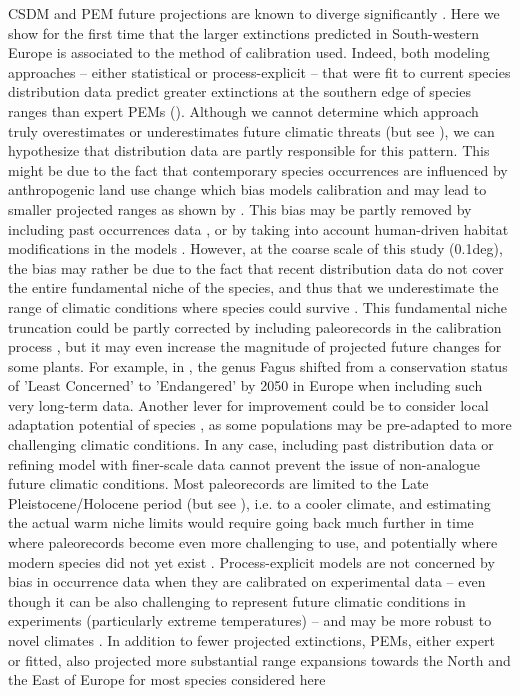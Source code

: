 \documentclass[letterpaper,8pt]{extarticle}  %
\begin{document}
\begin{doublespacing}
\begin{linenumbers}
CSDM and PEM future projections are known to diverge significantly \citep{Morin2009, Keenan2011, Cheaib2012, Takolander2019}.
Here we show for the first time that the larger extinctions predicted in South-western Europe is associated to the method of calibration used. Indeed, both modeling approaches -- either statistical or process-explicit -- that were fit to current species distribution data predict greater extinctions at the southern edge of species ranges than expert PEMs (). Although we cannot determine which approach truly overestimates or underestimates future climatic threats (but see \citet{VanderMeersch2024}), we can hypothesize that distribution data are partly responsible for this pattern. This might be due to the fact that contemporary species occurrences are influenced by anthropogenic land use change which bias models calibration and may lead to smaller projected ranges as shown by \citep{Ay2017, Faurby2018}. This bias may be partly removed by including past occurrences data \citep{Faurby2018}, or by taking into account human-driven habitat modifications in the models \citep{Ay2017}. However, at the coarse scale of this study (0.1deg), the bias may rather be due to the fact that recent distribution data do not cover the entire fundamental niche of the species, and thus that we underestimate the range of climatic conditions where species could survive \citep{NoguesBravo2016, Chevalier2024}. This fundamental niche truncation could be partly corrected by including paleorecords in the calibration process \citep{Maiorano2012}, but it may even increase the magnitude of projected future changes for some plants. For example, in \citet{NoguesBravo2016}, the genus Fagus shifted from a conservation status of 'Least Concerned' to 'Endangered' by 2050 in Europe when including such very long-term data. Another lever for improvement could be to consider local adaptation potential of species \citep{BenitoGarzon2011}, as some populations may be pre-adapted to more challenging climatic conditions. In any case, including past distribution data or refining model with finer-scale data cannot prevent the issue of non-analogue future climatic conditions. Most paleorecords are limited to the Late Pleistocene/Holocene period (but see \citealp{Chiarenza2023}), i.e. to a cooler climate, and estimating the actual warm niche limits would require going back much further in time where paleorecords become even more challenging to use, and potentially where modern species did not yet exist \citep{Burke2018, Chevalier2024}. Process-explicit models are not concerned by bias in occurrence data when they are calibrated on experimental data -- even though it can be also challenging to represent future climatic conditions in experiments (particularly extreme temperatures) -- and may be more robust to novel climates \citep{VanderMeersch2024}. In addition to fewer projected extinctions, PEMs, either expert or fitted, also projected more substantial range expansions towards the North and the East of Europe for most species considered here 
\end{linenumbers}
\end{doublespacing}
\end{document}
